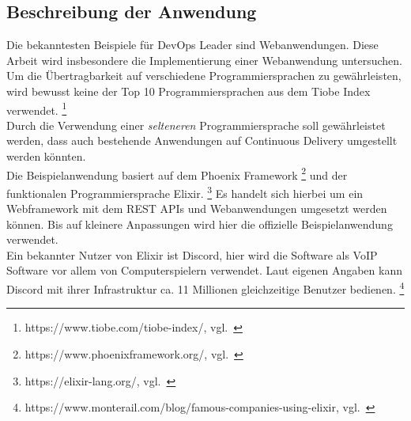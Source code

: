 \subsection{Beschreibung der Anwendung}\label{beschreibung_anwendung}

Die bekanntesten Beispiele für DevOps Leader sind Webanwendungen.
Diese Arbeit wird insbesondere die Implementierung einer Webanwendung untersuchen.
Um die Übertragbarkeit auf verschiedene Programmiersprachen zu gewährleisten, wird bewusst keine der Top 10 Programmiersprachen aus dem Tiobe Index verwendet. \footnote{https://www.tiobe.com/tiobe-index/, vgl.~\cite{TIOBE}} \\
Durch die Verwendung einer \textsl{selteneren} Programmiersprache soll gewährleistet werden, dass auch bestehende Anwendungen auf Continuous Delivery umgestellt werden könnten. \\

Die Beispielanwendung basiert auf dem Phoenix Framework \footnote{https://www.phoenixframework.org/, vgl.~\cite{PHOENIX}}
und der funktionalen Programmiersprache Elixir. \footnote{https://elixir-lang.org/, vgl.~\cite{ELIXIR}}
Es handelt sich hierbei um ein Webframework mit dem REST APIs und Webanwendungen umgesetzt werden können.
Bis auf kleinere Anpassungen wird hier die offizielle Beispielanwendung verwendet. \\

Ein bekannter Nutzer von Elixir ist Discord, hier wird die Software als VoIP Software vor allem von Computerspielern verwendet.
Laut eigenen Angaben kann Discord mit ihrer Infrastruktur ca. 11 Millionen gleichzeitige Benutzer bedienen.
\footnote{https://www.monterail.com/blog/famous-companies-using-elixir, vgl.~\cite{ELIXIR_COMPANIES}}